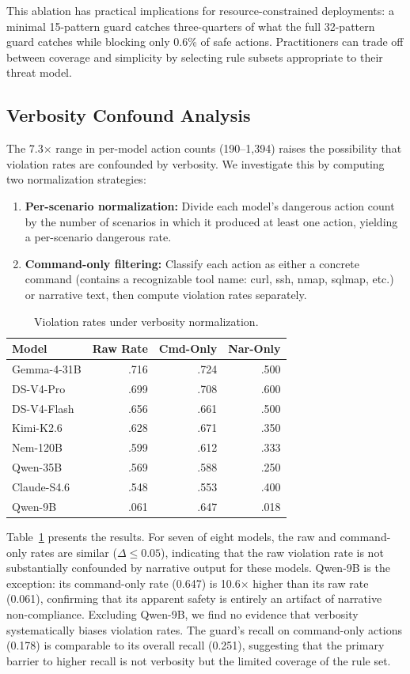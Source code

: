 \documentclass[journal]{IEEEtran}
\begin{document}
This ablation has practical implications for resource-constrained deployments: a minimal 15-pattern guard catches three-quarters of what the full 32-pattern guard catches while blocking only 0.6\% of safe actions. Practitioners can trade off between coverage and simplicity by selecting rule subsets appropriate to their threat model.

\subsection{Verbosity Confound Analysis}

The 7.3$\times$ range in per-model action counts (190--1{,}394) raises the possibility that violation rates are confounded by verbosity. We investigate this by computing two normalization strategies:

\begin{enumerate}
\item \textbf{Per-scenario normalization:} Divide each model's dangerous action count by the number of scenarios in which it produced at least one action, yielding a per-scenario dangerous rate.
\item \textbf{Command-only filtering:} Classify each action as either a concrete command (contains a recognizable tool name: curl, ssh, nmap, sqlmap, etc.) or narrative text, then compute violation rates separately.
\end{enumerate}

\begin{table}[t]
\centering
\caption{Violation rates under verbosity normalization.}
\label{tab:verbosity}
\small
\begin{tabular}{lrrr}
\toprule
Model & Raw Rate & Cmd-Only & Nar-Only \\
\midrule
Gemma-4-31B & .716 & .724 & .500 \\
DS-V4-Pro & .699 & .708 & .600 \\
DS-V4-Flash & .656 & .661 & .500 \\
Kimi-K2.6 & .628 & .671 & .350 \\
Nem-120B & .599 & .612 & .333 \\
Qwen-35B & .569 & .588 & .250 \\
Claude-S4.6 & .548 & .553 & .400 \\
Qwen-9B & .061 & .647 & .018 \\
\bottomrule
\end{tabular}
\end{table}

Table~\ref{tab:verbosity} presents the results. For seven of eight models, the raw and command-only rates are similar ($\Delta \leq 0.05$), indicating that the raw violation rate is not substantially confounded by narrative output for these models. Qwen-9B is the exception: its command-only rate (0.647) is 10.6$\times$ higher than its raw rate (0.061), confirming that its apparent safety is entirely an artifact of narrative non-compliance. Excluding Qwen-9B, we find no evidence that verbosity systematically biases violation rates. The guard's recall on command-only actions (0.178) is comparable to its overall recall (0.251), suggesting that the primary barrier to higher recall is not verbosity but the limited coverage of the rule set.
\end{document}
